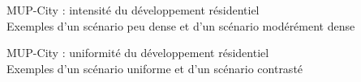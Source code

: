 \documentclass[xcolor=table]{beamer}
\begin{document}
\begin{frame}{MUP-City : intensité du développement résidentiel}
\vspace{1cm}
\\
{\footnotesize Exemples d'un scénario peu dense et d'un scénario modérément dense} %
\end{frame}


\begin{frame}{MUP-City : uniformité du développement résidentiel}
\vspace{1cm}
\\
{\footnotesize Exemples d'un scénario uniforme et d'un scénario contrasté}%
\end{frame}

\end{document}
